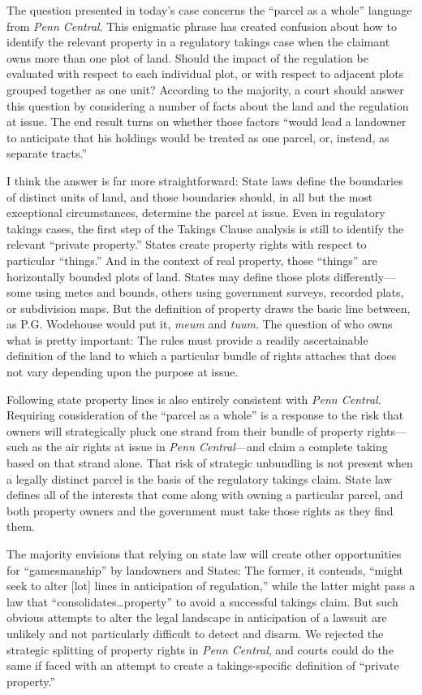 The question presented in today's case concerns the ``parcel as a whole''
language from \textit{Penn Central}. This enigmatic phrase has created confusion
about how to identify the relevant property in a regulatory takings case when
the claimant owns more than one plot of land. Should the impact of the
regulation be evaluated with respect to each individual plot, or with respect to
adjacent plots grouped together as one unit? According to the majority, a court
should answer this question by considering a number of facts about the land and
the regulation at issue. The end result turns on whether those factors ``would
lead a landowner to anticipate that his holdings would be treated as one parcel,
or, instead, as separate tracts.'' 

I think the answer is far more straightforward: State laws define the boundaries
of distinct units of land, and those boundaries should, in all but the most
exceptional circumstances, determine the parcel at issue. Even in regulatory
takings cases, the first step of the Takings Clause analysis is still to
identify the relevant ``private property.'' States create property rights with
respect to particular ``things.'' And in the context of real property, those
``things'' are horizontally bounded plots of land. States may define those plots
differently---some using metes and bounds, others using government surveys,
recorded plats, or subdivision maps. But the definition of property draws the
basic line between, as P.G. Wodehouse would put it, \textit{meum} and
\textit{tuum}. The question of who owns what is pretty important: The rules must
provide a readily ascertainable definition of the land to which a particular
bundle of rights attaches that does not vary depending upon the purpose at
issue. 

Following state property lines is also entirely consistent with \textit{Penn
Central}. Requiring consideration of the ``parcel as a whole'' is a response to
the risk that owners will strategically pluck one strand from their bundle of
property rights---such as the air rights at issue in \textit{Penn Central}---and
claim a complete taking based on that strand alone. That risk of strategic
unbundling is not present when a legally distinct parcel is the basis of the
regulatory takings claim. State law defines all of the interests that come along
with owning a particular parcel, and both property owners and the government
must take those rights as they find them.

The majority envisions that relying on state law will create other opportunities
for ``gamesmanship'' by landowners and States: The former, it contends, ``might
seek to alter [lot] lines in anticipation of regulation,'' while the latter
might pass a law that ``consolidates\ldots property'' to avoid a successful
takings claim. But such obvious attempts to alter the legal landscape in
anticipation of a lawsuit are unlikely and not particularly difficult to detect
and disarm. We rejected the strategic splitting of property rights in
\textit{Penn Central}, and courts could do the same if faced with an attempt to
create a takings-specific definition of ``private property.''

